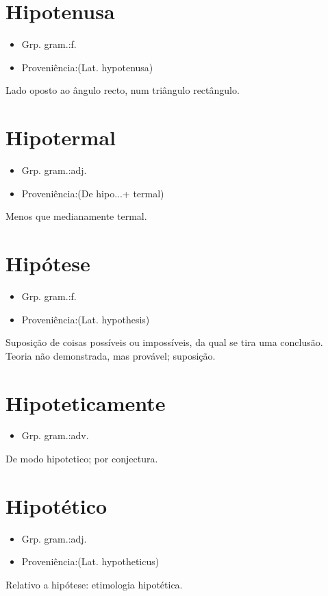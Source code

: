 \documentclass{article}
\begin{document}
\section{Hipotenusa}
\begin{itemize}
\item {Grp. gram.:f.}
\end{itemize}
\begin{itemize}
\item {Proveniência:(Lat. \textunderscore hypotenusa\textunderscore )}
\end{itemize}
Lado oposto ao ângulo recto, num triângulo rectângulo.
\section{Hipotermal}
\begin{itemize}
\item {Grp. gram.:adj.}
\end{itemize}
\begin{itemize}
\item {Proveniência:(De \textunderscore hipo...\textunderscore  + \textunderscore termal\textunderscore )}
\end{itemize}
Menos que medianamente termal.
\section{Hipótese}
\begin{itemize}
\item {Grp. gram.:f.}
\end{itemize}
\begin{itemize}
\item {Proveniência:(Lat. \textunderscore hypothesis\textunderscore )}
\end{itemize}
Suposição de coisas possíveis ou impossíveis, da qual se tira uma conclusão.
Teoria não demonstrada, mas provável; suposição.
\section{Hipoteticamente}
\begin{itemize}
\item {Grp. gram.:adv.}
\end{itemize}
De modo hipotetico; por conjectura.
\section{Hipotético}
\begin{itemize}
\item {Grp. gram.:adj.}
\end{itemize}
\begin{itemize}
\item {Proveniência:(Lat. \textunderscore hypotheticus\textunderscore )}
\end{itemize}
Relativo a hipótese: \textunderscore etimologia hipotética\textunderscore .
\end{document}
